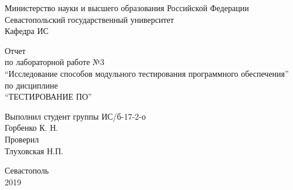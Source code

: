 \documentclass[a4paper,14pt]{extarticle}
\newcommand{\mylabnumber}{3}
\newcommand{\mylabtitle}{Исследование способов 
                            модульного тестирования программного обеспечения}
\newcommand{\mysubject}{Тестирование ПО}
\newcommand{\mylecturer}{Тлуховская Н.П.}
\begin{document}
    \lstset{ %
        basicstyle=\footnotesize\ttfamily,
        breaklines=true,
        numbersep=5pt,
        tabsize=4,
        gobble=8,
        extendedchars=\true,
        keepspaces=\true,
        numbers=left,
        stringstyle=\ttfamily,
        showstringspaces=\false
    }


    \begin{titlepage}
        
        \thispagestyle{empty}
        
        \begin{center}
            
            Министерство науки и высшего образования Российской Федерации \\
            Севастопольский государственный университет \\
            Кафедра ИС
            
            \vfill

            Отчет \\
            по лабораторной работе №\mylabnumber \\
            \enquote{\mylabtitle} \\
            по дисциплине \\
            \enquote{\MakeTextUppercase{\mysubject}}

        \end{center}

        \vspace{1cm}

        \noindent\hspace{7.5cm} Выполнил студент группы ИС/б-17-2-о \\
        \null\hspace{7.5cm} Горбенко К. Н. \\
        \null\hspace{7.5cm} Проверил \\
        \null\hspace{7.5cm} \mylecturer

        \vfill

        \begin{center}
            Севастополь \\
            2019
        \end{center}

    \end{titlepage}
\end{document}
